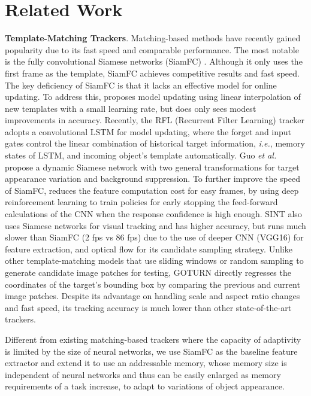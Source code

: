 \documentclass[runningheads]{llncs}
\begin{document}
\section{Related Work}
\textbf{Template-Matching Trackers}. Matching-based methods have recently gained popularity due to its fast speed and comparable performance. The most notable is the fully convolutional Siamese networks (SiamFC) \cite{Bertinetto2016}. Although it only uses the first frame as the template, SiamFC achieves competitive results and fast speed. The key deficiency of SiamFC is that it lacks an effective model for online updating. 
To address this, \cite{Valmadre2017} proposes model updating using linear interpolation of new templates with a small learning rate, but does only sees modest improvements in accuracy.
%
Recently, the RFL (Recurrent Filter Learning) tracker \cite{Yang2017} adopts a convolutional LSTM for model updating, where the forget and input gates control the linear combination of historical target information, \emph{i.e.}, memory states of LSTM, and incoming object's template automatically. Guo \emph{et al.} \cite{Guo2017} propose a dynamic Siamese network with two general transformations for target appearance variation and background suppression.
To further improve the speed of SiamFC, \cite{Huang2017} 
reduces the feature computation cost for easy frames, by using deep reinforcement learning to train policies for early stopping the feed-forward calculations of the CNN when the response confidence is high enough.
%
SINT \cite{Tao2016} also uses Siamese networks for visual tracking and has higher accuracy, but runs much slower than SiamFC (2 fps vs 86 fps) due to the use of deeper CNN (VGG16) for feature extraction, and optical flow for its candidate sampling strategy. Unlike other template-matching models that use sliding windows or random sampling to generate candidate image patches for testing, GOTURN \cite{Held2016} directly regresses the coordinates of the target's bounding box by comparing the previous and current image patches. Despite its advantage on handling scale and aspect ratio changes and fast speed, its tracking accuracy is much lower than other state-of-the-art trackers. 

Different from existing matching-based trackers where the capacity of adaptivity is limited by the size of neural networks, we use  SiamFC \cite{Bertinetto2016} as the baseline feature extractor and extend it to use an addressable memory,  whose memory size is independent of neural networks and thus can be easily enlarged as memory requirements of a task increase, to adapt to variations of object appearance.
\end{document}
